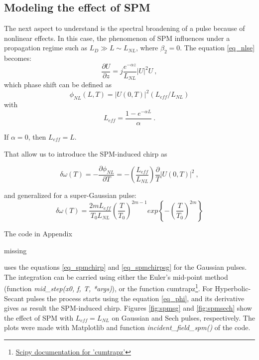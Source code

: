         \subsection{Modeling the effect of SPM}
        The next aspect to understand is the spectral broadening of a pulse because of nonlinear effects. In this case, the phenomenon of SPM influences under a propagation regime such as $ L_D \gg L \sim L_{NL} $, where $\beta_2=0$. The equation \eqref{eq_nlse} becomes: 
            \begin{equation}
                \frac{\partial U}{\partial z} = j\frac{e^{-\alpha z}}{L_{NL}}|U|^2 U \ ,
            \end{equation}
            which phase shift can be defined as 
            \begin{equation} \label{eq_phi}
                \phi_{NL}(L,T) = |U(0,T)|^2 (L_{eff}/L_{NL})
            \end{equation}
            with 
            \begin{equation} \label{eq_leff}
                L_{eff} = \frac{1-e^{-\alpha L}}{\alpha} \ .
            \end{equation}
            
            If  $\alpha = 0$, then $L_{eff} = L$.
            
            That allow us to introduce the SPM-induced chirp as
            
            \begin{equation} \label{eq_spmchirp}
                \delta \omega(T) = -\frac{\partial \phi_{NL}}{\partial T} = -\left( \frac{L_{eff}}{L_{NL}} \right) \frac{\partial }{T} |U(0,T)|^2 \ ,
            \end{equation}
        
        
         and generalized for a super-Gaussian pulse:
            \begin{equation} \label{eq_spmchirpsg}
                \delta \omega(T) = \frac{2m L_{eff}}{T_0 L_{NL}}\left( \frac{T}{T_0}\right)^{2m-1}  exp\left\{ -\left( \frac{T}{T_0}\right)^{2m}   \right\}
            \end{equation}
        
        The code in Appendix 
        \begin{huge}
        missing
        \end{huge}
         uses the equations \eqref{eq_spmchirp} and \eqref{eq_spmchirpsg} for the Gaussian pulses. The integration can be carried using either the Euler's mid-point method \citep{euler} (function \emph{mid\_step(x0, f, T, *args)}), or the function cumtrapz\footnote{\href{https://docs.scipy.org/doc/scipy-0.14.0/reference/generated/scipy.integrate.cumtrapz.html}{Scipy documentation for 'cumtrapz'}}. For Hyperbolic-Secant pulses the process starts using the equation \eqref{eq_phi}, and its derivative gives as result the SPM-induced chirp. Figures \ref{fig:spmsg} and \ref{fig:spmsech} show the effect of SPM with $L_{eff} = L_{NL}$ \citep{AgrawalBook} on Gaussian and Sech pulses, respectively. The plots were made with Matplotlib and function \emph{incident\_field\_spm()} of the code.
        
